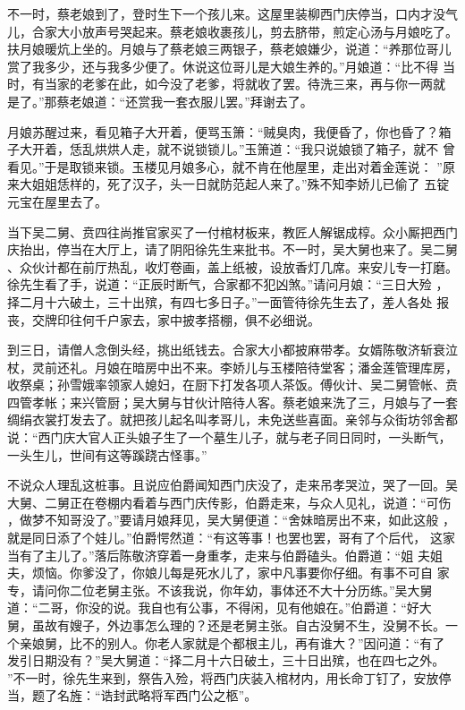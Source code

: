 不一时，蔡老娘到了，登时生下一个孩儿来。这屋里装柳西门庆停当，口内才没气
儿，合家大小放声号哭起来。蔡老娘收裹孩儿，剪去脐带，煎定心汤与月娘吃了。
扶月娘暖炕上坐的。月娘与了蔡老娘三两银子，蔡老娘嫌少，说道：“养那位哥儿
赏了我多少，还与我多少便了。休说这位哥儿是大娘生养的。”月娘道：“比不得
当时，有当家的老爹在此，如今没了老爹，将就收了罢。待洗三来，再与你一两就
是了。”那蔡老娘道：“还赏我一套衣服儿罢。”拜谢去了。

月娘苏醒过来，看见箱子大开着，便骂玉箫：“贼臭肉，我便昏了，你也昏了？箱
子大开着，恁乱烘烘人走，就不说锁锁儿。”玉箫道：“我只说娘锁了箱子，就不
曾看见。”于是取锁来锁。玉楼见月娘多心，就不肯在他屋里，走出对着金莲说：
”原来大姐姐恁样的，死了汉子，头一日就防范起人来了。”殊不知李娇儿已偷了
五锭元宝在屋里去了。

当下吴二舅、贲四往尚推官家买了一付棺材板来，教匠人解锯成椁。众小厮把西门
庆抬出，停当在大厅上，请了阴阳徐先生来批书。不一时，吴大舅也来了。吴二舅
、众伙计都在前厅热乱，收灯卷画，盖上纸被，设放香灯几席。来安儿专一打磨。
徐先生看了手，说道：“正辰时断气，合家都不犯凶煞。”请问月娘：“三日大殓
，择二月十六破土，三十出殡，有四七多日子。”一面管待徐先生去了，差人各处
报丧，交牌印往何千户家去，家中披孝搭棚，俱不必细说。

到三日，请僧人念倒头经，挑出纸钱去。合家大小都披麻带孝。女婿陈敬济斩衰泣
杖，灵前还礼。月娘在暗房中出不来。李娇儿与玉楼陪待堂客；潘金莲管理库房，
收祭桌；孙雪娥率领家人媳妇，在厨下打发各项人茶饭。傅伙计、吴二舅管帐、贲
四管孝帐；来兴管厨；吴大舅与甘伙计陪待人客。蔡老娘来洗了三，月娘与了一套
绸绢衣裳打发去了。就把孩儿起名叫孝哥儿，未免送些喜面。亲邻与众街坊邻舍都
说：“西门庆大官人正头娘子生了一个墓生儿子，就与老子同日同时，一头断气，
一头生儿，世间有这等蹊跷古怪事。”

不说众人理乱这桩事。且说应伯爵闻知西门庆没了，走来吊孝哭泣，哭了一回。吴
大舅、二舅正在卷棚内看着与西门庆传影，伯爵走来，与众人见礼，说道：“可伤
，做梦不知哥没了。”要请月娘拜见，吴大舅便道：“舍妹暗房出不来，如此这般
，就是同日添了个娃儿。”伯爵愕然道：“有这等事！也罢也罢，哥有了个后代，
这家当有了主儿了。”落后陈敬济穿着一身重孝，走来与伯爵磕头。伯爵道：“姐
夫姐夫，烦恼。你爹没了，你娘儿每是死水儿了，家中凡事要你仔细。有事不可自
家专，请问你二位老舅主张。不该我说，你年幼，事体还不大十分历练。”吴大舅
道：“二哥，你没的说。我自也有公事，不得闲，见有他娘在。”伯爵道：“好大
舅，虽故有嫂子，外边事怎么理的？还是老舅主张。自古没舅不生，没舅不长。一
个亲娘舅，比不的别人。你老人家就是个都根主儿，再有谁大？”因问道：“有了
发引日期没有？”吴大舅道：“择二月十六日破土，三十日出殡，也在四七之外。
”不一时，徐先生来到，祭告入殓，将西门庆装入棺材内，用长命丁钉了，安放停
当，题了名旌：“诰封武略将军西门公之柩”。

